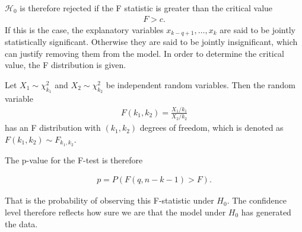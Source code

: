 $\mathcal{H}_0$ is therefore rejected if the F statistic is greater than the critical value
\begin{align*}
    F>c.
\end{align*}
If this is the case, the explanatory variables $x_{k-q+1}, \ldots, x_k$ are said to be jointly statistically significant. 
Otherwise they are said to be jointly insignificant, which can justify removing them from the model. 
In order to determine the critical value, the F distribution is given.


\begin{definition}[F Distribution]
    Let $X_1 \sim \chi_{k_1}^2$ and $X_2 \sim \chi_{k_2}^2$ be independent random variables. Then the random variable 
        \begin{align*}
            F(k_1,k_2) = \frac{X_1/k_1}{X_2/k_2}
        \end{align*}
    has an F distribution with $(k_1, k_2)$ degrees of freedom, which is denoted as $F(k_1,k_2) \sim F_{k_1, k_2}$.
\end{definition}

The p-value for the F-test is therefore

\begin{align*}
    p = P(F(q,n-k-1) > F).
\end{align*}

That is the probability of observing this F-statistic under $H_0$. The confidence level therefore reflects how sure we are that the model under $H_0$ has generated the data.


